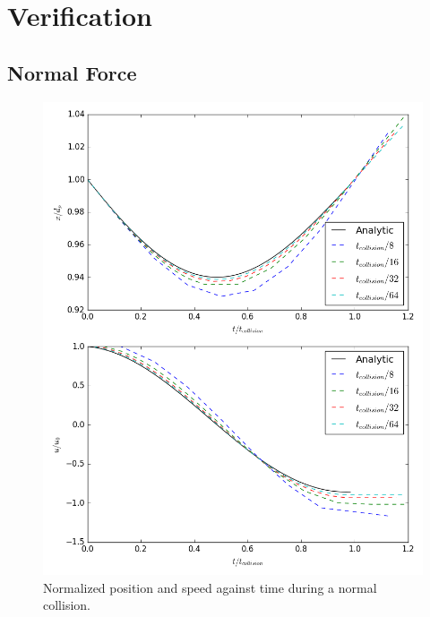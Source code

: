\documentclass[10pt,a4paper,titlepage]{report}
\begin{document}
\section{Verification}
\subsection{Normal Force}
\begin{figure}[!htb]
\centering
\includegraphics[scale=0.75]{figures/normal_force_verification.png}
\caption{Normalized position and speed against time during a normal collision.}
\label{fig:normal_force_verification}
\end{figure}
\end{document}
